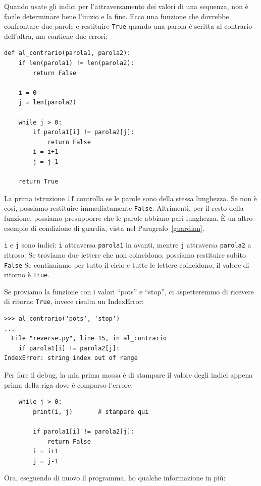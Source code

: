 \documentclass[10pt]{book}
\begin{document}
Quando usate gli indici per l'attraversamento dei valori di una sequenza, non è facile determinare bene l'inizio e la fine. Ecco una funzione che dovrebbe confrontare due parole e restituire {\tt True} quando una parola è scritta al contrario dell'altra, ma contiene due errori:

\begin{verbatim}
def al_contrario(parola1, parola2):
    if len(parola1) != len(parola2):
        return False
    
    i = 0
    j = len(parola2)

    while j > 0:
        if parola1[i] != parola2[j]:
            return False
        i = i+1
        j = j-1

    return True
\end{verbatim}
%
La prima istruzione {\tt if} controlla se le parole sono della stessa lunghezza. Se non è così, possiamo restituire immediatamente {\tt False}. Altrimenti, per il resto della funzione, possiamo presupporre che le parole abbiano pari lunghezza. È un altro esempio di condizione di guardia, vista nel Paragrafo~\ref{guardian}.

{\tt i} e {\tt j} sono indici: {\tt i} attraversa {\tt parola1}
in avanti, mentre {\tt j} attraversa {\tt parola2} a ritroso. Se troviamo due lettere che non coincidono, possiamo restituire subito {\tt False} Se continuiamo per tutto il ciclo e tutte le lettere coincidono, il valore di ritorno è {\tt True}.

Se proviamo la funzione con i valori ``pots'' e ``stop'', ci aspetteremmo di ricevere di ritorno {\tt True}, invece risulta un IndexError:

\begin{verbatim}
>>> al_contrario('pots', 'stop')
...
  File "reverse.py", line 15, in al_contrario
    if parola1[i] != parola2[j]:
IndexError: string index out of range
\end{verbatim}
%
Per fare il debug, la mia prima mossa è di stampare il valore degli indici appena prima della riga dove è comparso l'errore.

\begin{verbatim}
    while j > 0:
        print(i, j)       # stampare qui
        
        if parola1[i] != parola2[j]:
            return False
        i = i+1
        j = j-1
\end{verbatim}
%
Ora, eseguendo di nuovo il programma, ho qualche informazione in più:
\end{document}
